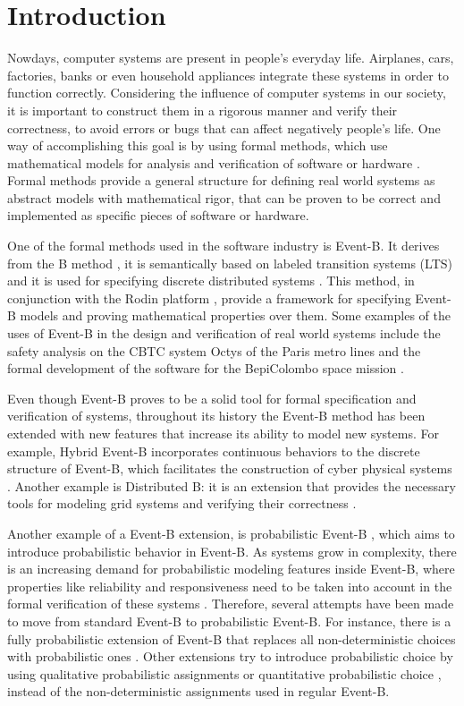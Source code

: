 \chapter{Introduction}
Nowdays, computer systems are present in people's everyday life. Airplanes, cars, factories, banks or even household appliances integrate these systems in order to function correctly. Considering the influence of computer systems in our society, it is important to construct them in a rigorous manner and verify their correctness, to avoid errors or bugs that can affect negatively people's life. One way of accomplishing this goal is by using formal methods, which use mathematical models for analysis and verification of software or hardware \cite{Woodcock2009}. Formal methods provide a general structure for defining real world systems as abstract models with mathematical rigor, that can be proven to be correct and implemented as specific pieces of software or hardware.   

One of the formal methods used in the software industry is Event-B. It derives from the B method \cite{Abrial1996}, it is semantically based on labeled transition systems (LTS) \cite{LTS} and it is used for specifying discrete distributed systems \cite{Abrial2011}. This method, in conjunction with the Rodin platform \cite{Rodin}, provide a framework for specifying Event-B models and proving mathematical properties over them. Some examples of the uses of Event-B in the design and verification of real world systems include the safety analysis on the CBTC system Octys of the Paris metro lines \cite{Comptier2017} and the formal development of the software for the BepiColombo space mission \cite{Iliasov2010}. 

Even though Event-B proves to be a solid tool for formal specification and verification of systems, throughout its history the Event-B method has been extended with new features that increase its ability to model new systems. For example, Hybrid Event-B incorporates continuous behaviors to the discrete structure of Event-B, which facilitates the construction of cyber physical systems \cite{Banach2015}. Another example is Distributed B: it is an extension that provides the necessary tools for modeling grid systems and verifying their correctness \cite{Grid}.

Another example of  a Event-B extension, is probabilistic Event-B \cite{Morgan2005}, which aims to introduce probabilistic behavior in Event-B. As systems grow in complexity, there is an increasing demand for probabilistic modeling features inside Event-B, where properties like reliability and responsiveness need to be taken into account in the formal verification of these systems \cite{Aouadhi2017}. Therefore, several attempts have been made to move from standard Event-B to probabilistic Event-B. For instance, there is a fully probabilistic extension of Event-B that replaces all non-deterministic choices with probabilistic ones \cite{Aouadhi2017}. Other extensions try to introduce probabilistic choice by using qualitative probabilistic assignments \cite{Hallerstede2007} or quantitative probabilistic choice \cite{Tarasyuk2010}, instead of the non-deterministic assignments used in regular Event-B.

